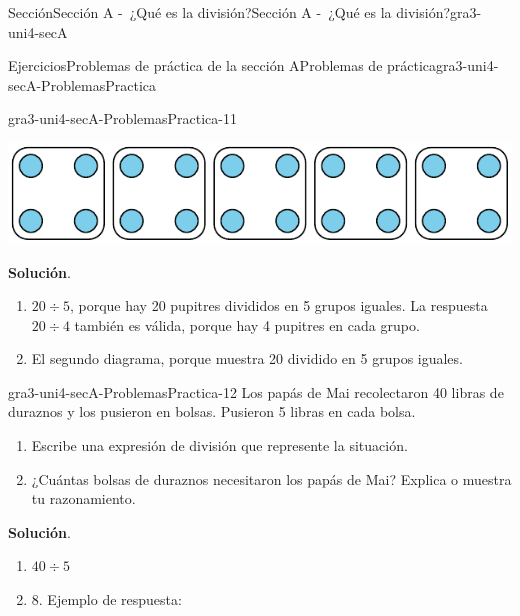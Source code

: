 \documentclass[oneside,10pt,]{article}
\newcommand{\blocktitlefont}{\relax}
\begin{document}
\begin{sectionptx}{Sección}{Sección A -~¿Qué es la división?}{}{Sección A -~¿Qué es la división?}{}{}{gra3-uni4-secA}
\begin{exercises-subsection}{Ejercicios}{Problemas de práctica de la sección A}{}{Problemas de práctica}{}{}{gra3-uni4-secA-ProblemasPractica}
\begin{divisionexercise}{9}{}{}{gra3-uni4-secA-ProblemasPractica-11}
\begin{enumerate}[label={(\alph*)}]
\begin{sidebyside}{2}{0}{0}{0}
\begin{sbspanel}{0.93}
\includegraphics[width=\linewidth]{external/svg-source/tikz-file-151672.pdf}
\end{sbspanel}%
\end{sidebyside}%
\end{enumerate}
%
\par\smallskip%
\noindent\textbf{\blocktitlefont Solución}.\hypertarget{gra3-uni4-secA-ProblemasPractica-11-2}{}\quad{}%
\begin{enumerate}[label={(\alph*)}]
\item{}\(20 \div 5\), porque hay 20 pupitres divididos en 5 grupos iguales. La respuesta \(20 \div 4\) también es válida, porque hay 4 pupitres en cada grupo.%
\item{}El segundo diagrama, porque muestra 20 dividido en 5 grupos iguales.%
\end{enumerate}
\end{divisionexercise}%
\begin{divisionexercise}{10}{}{}{gra3-uni4-secA-ProblemasPractica-12}%
Los papás de Mai recolectaron 40 libras de duraznos y los pusieron en bolsas. Pusieron 5 libras en cada bolsa.%
\par
%
\begin{enumerate}[label={(\alph*)}]
\item{}Escribe una expresión de división que represente la situación.%
\item{}¿Cuántas bolsas de duraznos necesitaron los papás de Mai? Explica o muestra tu razonamiento.%
\end{enumerate}
%
\par\smallskip%
\noindent\textbf{\blocktitlefont Solución}.\hypertarget{gra3-uni4-secA-ProblemasPractica-12-2}{}\quad{}%
\begin{enumerate}[label={(\alph*)}]
\item{}\(\displaystyle 40 \div 5\)%
\item{}8. Ejemplo de respuesta:%
\begin{image}{0}{1}{0}{}%

\end{image}
\end{enumerate}
\end{divisionexercise}
\end{exercises-subsection}
\end{sectionptx}
\end{document}

